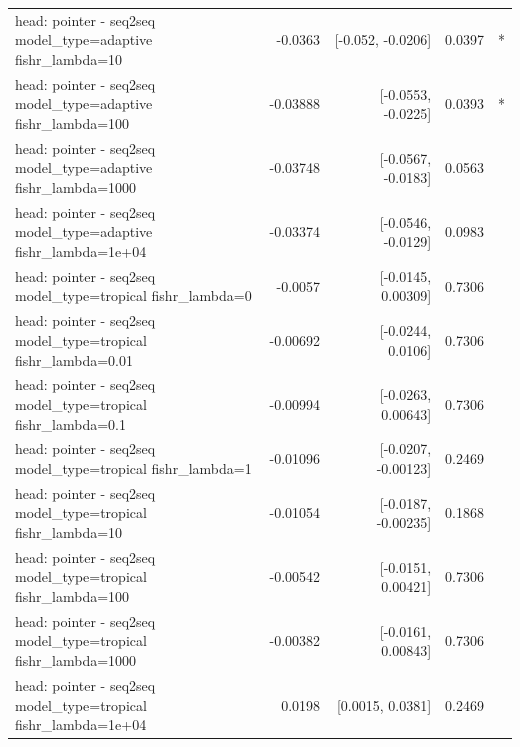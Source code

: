 \documentclass[10pt]{article}
\makeatletter
\newcommand{\stackcell}[1]{\begin{tabular}[t]{@{}l@{}}#1\end{tabular}}
\makeatother
\begin{document}
{\begin{longtable}{lrrrl}
\stackcell{head: pointer - seq2seq\\\footnotesize model\_type=adaptive fishr\_lambda=10 } & -0.0363 & [-0.052, -0.0206] & 0.0397 & *\\
\stackcell{head: pointer - seq2seq\\\footnotesize model\_type=adaptive fishr\_lambda=100 } & -0.03888 & [-0.0553, -0.0225] & 0.0393 & *\\
\stackcell{head: pointer - seq2seq\\\footnotesize model\_type=adaptive fishr\_lambda=1000 } & -0.03748 & [-0.0567, -0.0183] & 0.0563 & \\
\stackcell{head: pointer - seq2seq\\\footnotesize model\_type=adaptive fishr\_lambda=1e+04 } & -0.03374 & [-0.0546, -0.0129] & 0.0983 & \\
\stackcell{head: pointer - seq2seq\\\footnotesize model\_type=tropical fishr\_lambda=0 } & -0.0057 & [-0.0145, 0.00309] & 0.7306 & \\
\stackcell{head: pointer - seq2seq\\\footnotesize model\_type=tropical fishr\_lambda=0.01 } & -0.00692 & [-0.0244, 0.0106] & 0.7306 & \\
\stackcell{head: pointer - seq2seq\\\footnotesize model\_type=tropical fishr\_lambda=0.1 } & -0.00994 & [-0.0263, 0.00643] & 0.7306 & \\
\stackcell{head: pointer - seq2seq\\\footnotesize model\_type=tropical fishr\_lambda=1 } & -0.01096 & [-0.0207, -0.00123] & 0.2469 & \\
\stackcell{head: pointer - seq2seq\\\footnotesize model\_type=tropical fishr\_lambda=10 } & -0.01054 & [-0.0187, -0.00235] & 0.1868 & \\
\stackcell{head: pointer - seq2seq\\\footnotesize model\_type=tropical fishr\_lambda=100 } & -0.00542 & [-0.0151, 0.00421] & 0.7306 & \\
\stackcell{head: pointer - seq2seq\\\footnotesize model\_type=tropical fishr\_lambda=1000 } & -0.00382 & [-0.0161, 0.00843] & 0.7306 & \\
\stackcell{head: pointer - seq2seq\\\footnotesize model\_type=tropical fishr\_lambda=1e+04 } & 0.0198 & [0.0015, 0.0381] & 0.2469 & \\

\end{longtable}}
\end{document}
